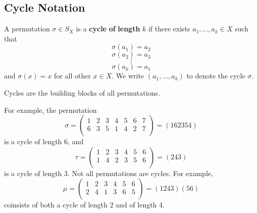 \documentclass[12pt, letterpaper]{report}
\begin{document}
\subsection*{Cycle Notation}
\begin{definition}
	A permutation \(\sigma \in S_X\) is a \textbf{cycle} \textbf{of} \textbf{length} \(k\) if there exists \(a_1,\ldots,a_k\in X\) such that
	\newpage\[
		\sigma \left( a_1 \right) =a_2
	\]
	\[
		\sigma \left( a_2 \right) =a_3
	\]
	\[
		\vdots
	\]
	\[
		\sigma \left( a_k \right) =a_1
	\]
	and \(\sigma (x)=x\) for all other \(x\in X\). We write \((a_1,\ldots,a_k)\) to denote the cycle \(\sigma \).
\end{definition}
\begin{remark}
	Cycles are the building blocks of all permutations.
\end{remark}
For example, the permutation 
\[
	\sigma =\begin{pmatrix}
		1 &2  &3  &4  &5  &6  &7   \\
		 6&3  &5  &1  &4  &2  &7   \\
	\end{pmatrix}=(162354)
\]
is a cycle of length 6, and 
\[
	\tau =\begin{pmatrix}
		1 &2  &3  &4  &5  &6   \\
		 1&4  &2  &3  &5  &6   \\
	\end{pmatrix}=(243)
\]
is a cycle of length 3. Not all permutations are cycles. For example,
\[
	\mu =\begin{pmatrix}
		1 &2  &3  &4  &5  &6   \\
		 2&4  &1  &3  &6  &5   \\
	\end{pmatrix}=(1243)(56)
\]
coinsists of both a cycle of length 2 and of length 4. 
\end{document}
